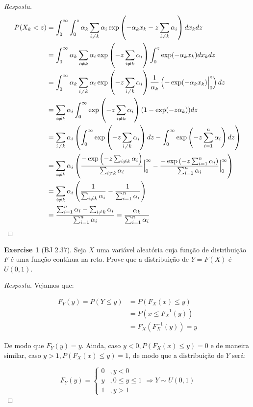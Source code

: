 \documentclass[
]{article}
\theoremstyle{definition}
\theoremstyle{definition}
\theoremstyle{definition}
\newtheorem{exercise}{Exercise}[section]
\theoremstyle{definition}
\theoremstyle{remark}
\begin{document}
\begin{proof}[Resposta]
\begin{align*}
P(X_{k} < z) &= \int_{0}^{\infty}\int_{0}^{z}\alpha_{k}\sum_{i \neq k}\alpha_{i}\exp\left(-\alpha_{k}x_{k} - z\sum_{i \neq k}\alpha_{i}\right)dx_{k}dz \\
&= \int_{0}^{\infty}\alpha_{k}\sum_{i \neq k}\alpha_{i}\exp\left(-z\sum_{i \neq k}\alpha_{i}\right)\int_{0}^{z}\exp(-\alpha_{k}x_{k})dx_{k}dz \\
&= \int_{0}^{\infty}\alpha_{k}\sum_{i \neq k}\alpha_{i}\exp\left(-z\sum_{i \neq k}\alpha_{i}\right)\frac{1}{\alpha_{k}}\left(-\exp(-\alpha_{k}x_{k})\Big{|}_{0}^{z}\right)dz \\
&= \sum_{i \neq k}\alpha_{i}\int_{0}^{\infty}\exp\left(-z\sum_{i \neq k}\alpha_{i}\right)(1-\exp(-z\alpha_{k}))dz \\
&= \sum_{i \neq k}\alpha_{i}\left(\int_{0}^{\infty}\exp\left(-z\sum_{i \neq k}\alpha_{i}\right)dz - \int_{0}^{\infty}\exp\left(-z\sum_{i=1}^{n}\alpha_{i}\right)dz\right) \\
&= \sum_{i \neq k}\alpha_{i}\left(\frac{-\exp\left(-z\sum_{i \neq k}\alpha_{i}\right)}{\sum_{i \neq k}\alpha_{i}}\Big{|}_{0}^{\infty} - \frac{-\exp\left(-z\sum_{i=1}^{n}\alpha_{i}\right)}{\sum_{i = 1}^{n}\alpha_{i}}\Big{|}_{0}^{\infty}\right) \\
&= \sum_{i \neq k}\alpha_{i}\left(\frac{1}{\sum_{i \neq k}\alpha_{i}} - \frac{1}{\sum_{i = 1}^{n}\alpha_{i}}\right) \\
&= \frac{\sum_{i=1}^{n}\alpha_{i} - \sum_{i \neq k}\alpha_{i}}{\sum_{i=1}^{n}\alpha_{i}} =  \frac{\alpha_{k}}{\sum_{i=1}^{n}\alpha_{i}}
\end{align*}
\end{proof}

\begin{exercise}[BJ 2.37]
\protect\hypertarget{exr:exer237}{}\label{exr:exer237}Seja \(X\) uma variável aleatória cuja função de distribuição \(F\) é uma função contínua na reta. Prove que a distribuição de \(Y = F(X)\) é \(U(0,1)\).
\end{exercise}

\begin{proof}[Resposta]
Vejamos que:

\begin{align*}
F_{Y}(y) = P(Y \le y) &= P(F_{X}(x) \le y) \\
&= P(x \le F_{X}^{-1}(y)) \\
&= F_{X}(F_{X}^{-1}(y)) = y
\end{align*}

De modo que \(F_{Y}(y) = y\). Ainda, caso \(y < 0, P(F_{X}(x) \le y) = 0\) e de maneira similar, caso \(y > 1, P(F_{X}(x) \le y) = 1\), de modo que a distribuição de \(Y\) será:

\begin{equation*}
F_{Y}(y) = \begin{cases}
0 &, y < 0 \\
y &, 0 \le y \le 1 \\
1 &, y > 1
\end{cases} \Rightarrow Y \sim U(0,1)
\end{equation*}
\end{proof}
\end{document}
